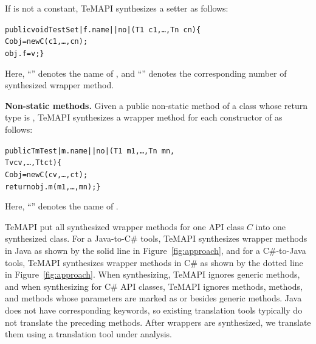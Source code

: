 If  is not a constant, TeMAPI synthesizes a setter as follows:

\begin{CodeOut}\vspace*{-1ex}
\begin{alltt}
 public void TestSet|f.name||no|(T1\ c1,\ldots, Tn\ cn)\{
   C obj = new C(c1,\ldots, cn);
   obj.f = v; \}
\end{alltt}
\end{CodeOut}\vspace*{-1ex}

Here, ``'' denotes the name of , and ``'' denotes the corresponding number of synthesized wrapper method.

\textbf{Non-static methods.} Given a public non-static method  of a class  whose return type is , TeMAPI synthesizes a wrapper method for each constructor  of  as follows:

\begin{CodeOut}\vspace*{-1ex}
\begin{alltt}
 public Tm Test|m.name||no|(T1\ m1,\ldots, Tn\ mn,
                            Tv cv, \ldots, Tt ct)\{
   C obj = new C(cv,\ldots, ct);
   return obj.m(m1,\ldots, mn); \}
\end{alltt}
\end{CodeOut}\vspace*{-1ex}

Here, ``'' denotes the name of .

TeMAPI put all synthesized wrapper methods for one API class $C$ into one synthesized class. For a Java-to-C\# tools, TeMAPI synthesizes wrapper methods in Java as shown by the solid line in Figure~\ref{fig:approach}, and for a C\#-to-Java tools, TeMAPI synthesizes wrapper methods in C\# as shown by the dotted line in Figure~\ref{fig:approach}. When synthesizing, TeMAPI ignores generic methods, and when synthesizing for C\# API classes, TeMAPI ignores  methods,  methods, and methods whose parameters are marked as  or  besides generic methods. Java does not have corresponding keywords, so existing translation tools typically do not translate the preceding methods. After wrappers are synthesized, we translate them using a translation tool under analysis.

